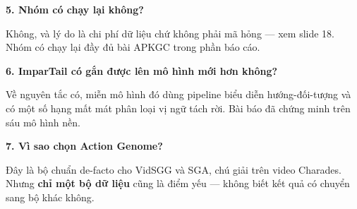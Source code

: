 \documentclass[11pt,a4paper]{article}
\begin{document}
\textbf{5. Nhóm có chạy lại không?}

Không, và lý do là chi phí dữ liệu chứ không phải mã hỏng --- xem slide 18. Nhóm có chạy lại đầy đủ bài APKGC trong phần báo cáo.

\textbf{6. ImparTail có gắn được lên mô hình mới hơn không?}

Về nguyên tắc có, miễn mô hình đó dùng pipeline biểu diễn hướng-đối-tượng và có một số hạng mất mát phân loại vị ngữ tách rời. Bài báo đã chứng minh trên sáu mô hình nền.

\textbf{7. Vì sao chọn Action Genome?}

Đây là bộ chuẩn de-facto cho VidSGG và SGA, chú giải trên video Charades. Nhưng \textbf{chỉ một bộ dữ liệu} cũng là điểm yếu --- không biết kết quả có chuyển sang bộ khác không.
\end{document}
